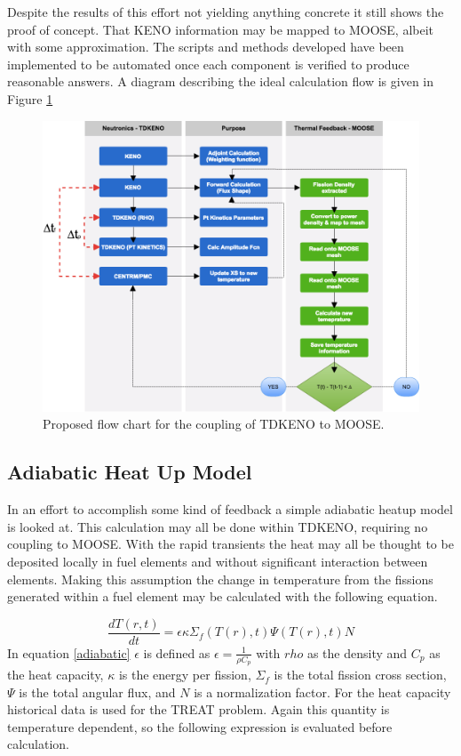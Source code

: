 \documentclass[11pt]{article}
\begin{document}
Despite the results of this effort not yielding anything concrete it still shows the proof of concept.  That KENO information may be mapped to MOOSE, albeit with some approximation.  The scripts and methods developed have been implemented to be automated once each component is verified to produce reasonable answers.  A diagram describing the ideal calculation flow is given in Figure \ref{fig:flow}

\begin{figure}[h]
    \centering
    \includegraphics[width=16cm]{figures/flowcharttdk.png}
    \caption{Proposed flow chart for the coupling of TDKENO to MOOSE.}
    \label{fig:flow}
\end{figure}

\subsection{Adiabatic Heat Up Model}

In an effort to accomplish some kind of feedback a simple adiabatic heatup model is looked at.  This calculation may all be done within TDKENO, requiring no coupling to MOOSE.  With the rapid transients the heat may all be thought to be deposited locally in fuel elements and without significant interaction between elements.  Making this assumption the change in temperature from the fissions generated within a fuel element may be calculated with the following equation.

\begin{equation}
    \frac{dT(r,t)}{dt} = \epsilon \kappa \Sigma_f(T(r),t) \Psi(T(r),t) N
    \label{adiabatic}
\end{equation}
In equation \ref{adiabatic} $\epsilon$ is defined as $\epsilon = \frac{1}{\rho C_p}$ with $rho$ as the density and $C_p$ as the heat capacity, $\kappa$ is the energy per fission, $\Sigma_f$ is the total fission cross section, $\Psi$ is the total angular flux, and $N$ is a normalization factor. For the heat capacity historical data is used for the TREAT problem.  Again this quantity is temperature dependent, so the following expression is evaluated before calculation.
\end{document}
